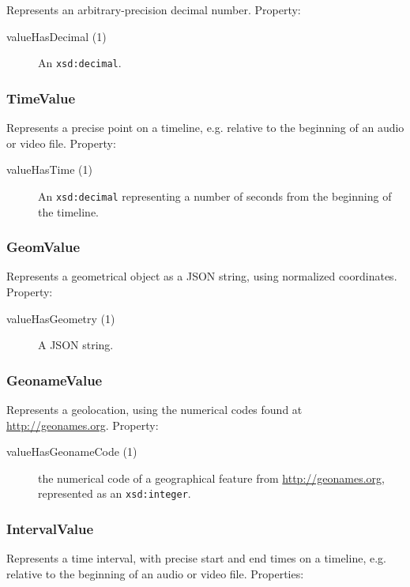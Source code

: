 \documentclass[12pt, a4paper]{article}
\begin{document}
Represents an arbitrary-precision decimal number. Property:

\begin{description}
	\item[valueHasDecimal (1)] An \texttt{xsd:decimal}.
\end{description}

\subsubsection{TimeValue}

Represents a precise point on a timeline, e.g. relative to the beginning of an audio or video file. Property:

\begin{description}
	\item[valueHasTime (1)]	An \texttt{xsd:decimal} representing a number of seconds from the beginning of the timeline.
\end{description}

\subsubsection{GeomValue}

Represents a geometrical object as a JSON string, using normalized coordinates. Property:

\begin{description}
	\item[valueHasGeometry (1)] A JSON string.
\end{description}

\subsubsection{GeonameValue}

Represents a geolocation, using the numerical codes found at \url{http://geonames.org}. Property:

\begin{description}
	\item[valueHasGeonameCode (1)] the numerical code of a geographical feature from \url{http://geonames.org}, represented as an \texttt{xsd:integer}.
\end{description}

\subsubsection{IntervalValue}

Represents a time interval, with precise start and end times on a timeline, e.g. relative to the beginning of an audio or video file. Properties:
\end{document}
